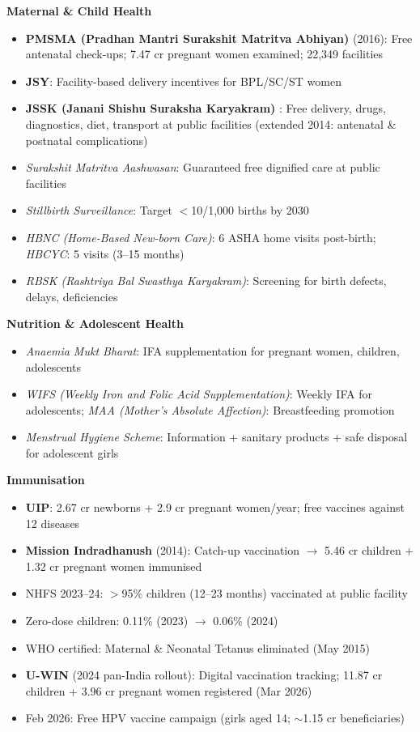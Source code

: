 \textbf{Maternal \& Child Health}
\begin{itemize}
  \item \textbf{PMSMA (Pradhan Mantri Surakshit Matritva Abhiyan)} (2016): Free antenatal check-ups; 7.47 cr pregnant women examined; 22,349 facilities
  \item \textbf{JSY}: Facility-based delivery incentives for BPL/SC/ST women
  \item \textbf{JSSK (Janani Shishu Suraksha Karyakram) }: Free delivery, drugs, diagnostics, diet, transport at public facilities (extended 2014: antenatal \& postnatal complications)
  \item \textit{Surakshit Matritva Aashwasan}: Guaranteed free dignified care at public facilities
  \item \textit{Stillbirth Surveillance}: Target $<$10/1,000 births by 2030
  \item \textit{HBNC (Home-Based New-born Care)}: 6 ASHA home visits post-birth; \textit{HBCYC}: 5 visits (3--15 months)
  \item \textit{RBSK (Rashtriya Bal Swasthya Karyakram)}: Screening for birth defects, delays, deficiencies
\end{itemize}

\textbf{Nutrition \& Adolescent Health}
\begin{itemize}
  \item \textit{Anaemia Mukt Bharat}: IFA supplementation for pregnant women, children, adolescents
  \item \textit{WIFS (Weekly Iron and Folic Acid Supplementation)}: Weekly IFA for adolescents; \textit{MAA (Mother's Absolute Affection)}: Breastfeeding promotion
  \item \textit{Menstrual Hygiene Scheme}: Information + sanitary products + safe disposal for adolescent girls
\end{itemize}

\textbf{Immunisation}
\begin{itemize}
  \item \textbf{UIP}: 2.67 cr newborns + 2.9 cr pregnant women/year; free vaccines against 12 diseases
  \item \textbf{Mission Indradhanush} (2014): Catch-up vaccination $\rightarrow$ 5.46 cr children + 1.32 cr pregnant women immunised
  \item NHFS 2023--24: $>$95\% children (12--23 months) vaccinated at public facility
  \item Zero-dose children: 0.11\% (2023) $\rightarrow$ 0.06\% (2024)
  \item WHO certified: Maternal \& Neonatal Tetanus eliminated (May 2015)
  \item \textbf{U-WIN} (2024 pan-India rollout): Digital vaccination tracking; 11.87 cr children + 3.96 cr pregnant women registered (Mar 2026)
  \item Feb 2026: Free HPV vaccine campaign (girls aged 14; $\sim$1.15 cr beneficiaries)
\end{itemize}


